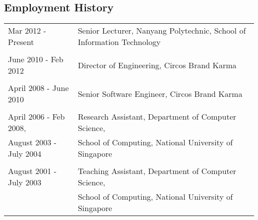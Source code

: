 \documentclass[margin,line]{res}
\newenvironment{list2}{
  \begin{list}{$\bullet$}{%
      \setlength{\itemsep}{0in}
      \setlength{\parsep}{0in} \setlength{\parskip}{0in}
      \setlength{\topsep}{0in} \setlength{\partopsep}{0in} 
      \setlength{\leftmargin}{0.2in}}}{\end{list}}
\newcommand{\longversion}[1]{}
\begin{document}
\begin{resume}
\section{\sc Employment History}
\begin{tabular}{ll}
 Mar 2012 - Present & Senior Lecturer, Nanyang Polytechnic, School of Information Technology \\ \\
 June 2010 - Feb 2012  & Director of Engineering, Circos Brand Karma \\ \\
 April 2008 - June 2010  & Senior Software Engineer, Circos Brand Karma \\ \\
 April 2006 - Feb 2008,  & Research Assistant, Department of Computer Science, \\
 August 2003 - July 2004  & School of Computing, National University of Singapore \\ \\
 August 2001 - July 2003 & Teaching Assistant, Department of Computer Science, \\
	          & School of Computing, National University of Singapore 
\end{tabular}


\longversion{
\section{\sc Teaching Activities}
\begin{list2} 
\item 2012/2013 SEM1: IT1209 Interactive Web Design
\item 2012/2013 SEM1: IT2592 Enterprise Business Application Project
\item 2012/2013 SEM1: IT3180 Emerging Trends and Technologies
\item 2012/2013 SEM2: IT3800 Open Source Technologies Development
\item 2012/2013 SEM2: IT2126 Object Oriented Programming
\\ 
\item 2008/2009 SEM 1: CS4212 Compiler Design (Part time)
\item 2001/2002 SEM 1: CS2102 Introduction to Database
\item 2001/2002 SEM 2: CS3214s Software Engineering Projects
\item 2002/2003 SEM 1: CS3214s Software Engineering Projects
\item 2002/2003 SEM 2: CS3214 Software Engineering Projects
\end{list2}
}


\end{resume}
\end{document}
